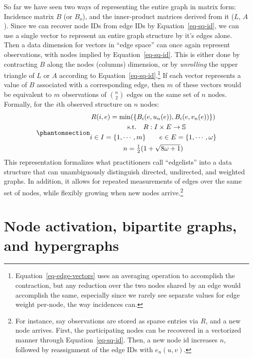 \documentclass[%
	12pt,
		oneside,
		letterpaper
]{book}
\begin{document}
So far we have seen two ways of representing the entire graph in matrix
form: Incidence matrix \(B\) (or \(B_o\)), and the inner-product
matrices derived from it (\(L\), \(A\)). Since we can recover node IDs
from edge IDs by Equation~\ref{eq-sq-id}, we can use a single vector to
represent an entire graph structure by it's edges alone. Then a data
dimension for vectors in ``edge space'' can once again represent
observations, with nodes implied by Equation~\ref{eq-sq-id}. This is
either done by contracting \(B\) along the nodes (columns) dimension, or
by \emph{unrolling} the upper triangle of \(L\) or \(A\) according to
Equation~\ref{eq-sq-id}.\footnote{ Equation~\ref{eq-edge-vectors} uses
  an averaging operation to accomplish the contraction, but any
  reduction over the two nodes shared by an edge would accomplish the
  same, especially since we rarely see separate values for edge weight
  per-node, the way incidences can.} If each vector represents a value
of \(B\) associated with a corresponding edge, then \(m\) of these
vectors would be equivalent to \(m\) observations of \({n \choose 2}\)
edges on the same set of \(n\) nodes. Formally, for the \(i\)th observed
structure on \(n\) nodes:
\begin{equation}\phantomsection\label{eq-edge-vectors}{
\begin{gathered}
R(i,e) = \min(\{B_i(e, u_n(e)),B_i(e,v_n(e))\}) \\
\quad \textrm{s.t.} \quad R:I\times E \rightarrow \mathbb{S}\\
i\in I = \{1,\cdots,m\} \qquad e \in E=\left\{1,\cdots,\omega\right\}\\
n=\tfrac{1}{2}(1+\sqrt{8\omega+1})
\end{gathered}
}\end{equation} This representation formalizes what practitioners call
``edgelists'' into a data structure that can unambiguously distinguish
directed, undirected, and weighted graphs. In addition, it allows for
repeated measurements of edges over the same set of nodes, while
flexibly growing when new nodes arrive.\footnote{ For instance, say
  observations are stored as sparse entries via \(R\), and a new node
  arrives. First, the participating nodes can be recovered in a
  vectorized manner through Equation~\ref{eq-sq-id}. Then, a new node id
  increases \(n\), followed by reassignment of the edge IDs with
  \(e_n(u,v)\).}

\section{Node activation, bipartite graphs, and
hypergraphs}\label{node-activation-bipartite-graphs-and-hypergraphs}
\end{document}

